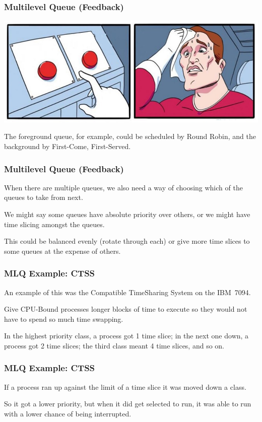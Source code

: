 \begin{frame}
\frametitle{Multilevel Queue (Feedback)}

\begin{center}
	\includegraphics[width=\textwidth]{images/choice-sweat.jpg}
\end{center}

The foreground queue, for example, could be scheduled by Round Robin, and the background by First-Come, First-Served.


\end{frame}

\begin{frame}
\frametitle{Multilevel Queue (Feedback)}

When there are multiple queues, we also need a way of choosing which of the queues to take from next. 

We might say some queues have absolute priority over others, or we might have time slicing amongst the queues. 

This could be balanced evenly (rotate through each) or give more time slices to some queues at the expense of others.

\end{frame}

\begin{frame}
\frametitle{MLQ Example: CTSS}

An example of this was the Compatible TimeSharing System on the IBM~7094. 

Give CPU-Bound processes longer blocks of time to execute so they would not have to spend so much time swapping. 

In the highest priority class, a process got 1 time slice; in the next one down, a process got 2 time slices; the third class meant 4 time slices, and so on. 

\end{frame}

\begin{frame}
\frametitle{MLQ Example: CTSS}

If a process ran up against the limit of a time slice it was moved down a class. 

So it got a lower priority, but when it did get selected to run, it was able to run with a lower chance of being interrupted.


\end{frame}

